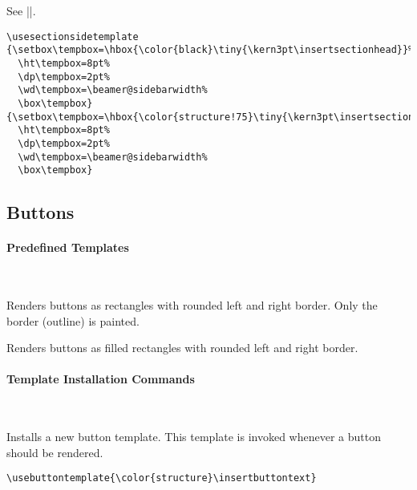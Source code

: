 \begin{command}{\usesubsectionsidetemplate{}}
  See |\usesectionsidetemplate|.
  \example
\begin{verbatim}
\usesectionsidetemplate
{\setbox\tempbox=\hbox{\color{black}\tiny{\kern3pt\insertsectionhead}}%
  \ht\tempbox=8pt%
  \dp\tempbox=2pt%
  \wd\tempbox=\beamer@sidebarwidth%
  \box\tempbox}
{\setbox\tempbox=\hbox{\color{structure!75}\tiny{\kern3pt\insertsectionhead}}%
  \ht\tempbox=8pt%
  \dp\tempbox=2pt%
  \wd\tempbox=\beamer@sidebarwidth%
  \box\tempbox}
\end{verbatim}
\end{command}










\subsection{Buttons}
\label{section-navigation-buttons}

\paragraph{Predefined Templates}\ 

\begin{command}{\beamertemplateoutlinebuttons}
  Renders buttons as rectangles with rounded left and right
  border. Only the border (outline) is painted.
\end{command}

\begin{command}{\beamertemplatesolidbuttons}
  Renders buttons as filled rectangles with rounded left and right
  border.
\end{command}


\paragraph{Template Installation Commands}\ 

\begin{command}{\usebuttontemplate{}}
  Installs a new button template. This template is invoked whenever a
  button should be rendered.
  \example
\begin{verbatim}
\usebuttontemplate{\color{structure}\insertbuttontext}
\end{verbatim}
\end{command}


